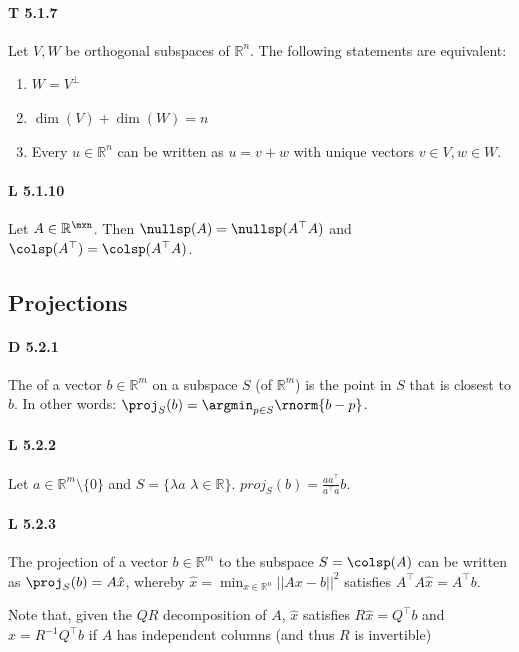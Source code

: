\paragraph{T 5.1.7} Let $V,W$ be orthogonal subspaces of $\mathbb{R}^n$.
The following statements are equivalent:
\begin{enumerate}
    \item $W=V^\bot$

    \item $\dim(V)+\dim(W)=n$

    \item Every $u\in\mathbb{R}^n$ can be written as
        $u=v+w$ with unique vectors $v\in V,w\in W$.
\end{enumerate}

\paragraph{L 5.1.10} Let $A\in\mathbb{R}^{\mxn}$. Then
$\nullsp(A)=\nullsp(A^\top A)$ and $\colsp(A^\top)=\colsp(A^\top A)$.

\subsection{Projections}

\paragraph{D 5.2.1} The  of a vector
$b\in\mathbb{R}^m$ on a subspace $S$ (of $\mathbb{R}^m$) is the point in
$S$ that is closest to $b$. In other words: $\proj_S(b)=\argmin_{p\in S}\rnorm{b-p}$.

\paragraph{L 5.2.2} Let $a \in \mathbb{R}^m \setminus \{0\}$ and
$S = \{\lambda a \,  \, \lambda \in \mathbb{R}\}$. $proj_S(b) = \frac{aa^\top}{a^\top a}b$.

\paragraph{L 5.2.3} The projection of a vector $b\in\mathbb{R}^m$ to
the subspace $S=\colsp(A)$ can be written as $\proj_S(b)=A\hat{x}$,
whereby $\hat{x} = \min_{x\in\mathbb{R}^n}{|| Ax-b||^2}$
satisfies $A^\top A\hat{x}=A^\top b$.

Note that, given the $QR$ decomposition
of $A$, $\hat{x}$ satisfies $R\hat{x} = Q^\top b$ and
$\hat{x} = R^{-1}Q^\top b$ if $A$ has independent columns
(and thus $R$ is invertible)

